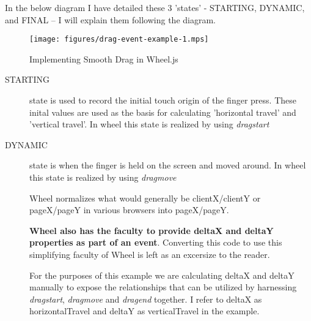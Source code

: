  In the below diagram I have detailed these 3 'states' - STARTING, DYNAMIC, and FINAL -- I will explain
 them following the diagram.

\begin{figure}[H] %
\begin{center}
\texttt{[image: figures/drag-event-example-1.mps]}
\end{center}
  \caption{Implementing Smooth Drag in Wheel.js}
\end{figure}

 \begin{description}
   \item[STARTING] state is used to record the initial touch origin of the finger press. These inital values
     are used as the basis for calculating 'horizontal travel' and 'vertical travel'. In wheel this state is
     realized by using \emph{dragstart}
     
   
   \item[DYNAMIC] state is when the finger is held on the screen and moved around. 
     In wheel this state is realized by using \emph{dragmove}

     Wheel normalizes what would generally be clientX/clientY or pageX/pageY in various browsers into pageX/pageY. 
   
   \textbf{Wheel also has the faculty to provide deltaX and deltaY properties as part of an event}.
      Converting this
     code to use this simplifying faculty of Wheel is left as an excersize to the reader.
     
     For the purposes of this example we are calculating deltaX and deltaY manually to expose
     the relationships that can be utilized by harnessing \emph{dragstart}, \emph{dragmove} and \emph{dragend}
     together. I refer to deltaX as horizontalTravel and deltaY as verticalTravel in the example.
     

\end{description}

